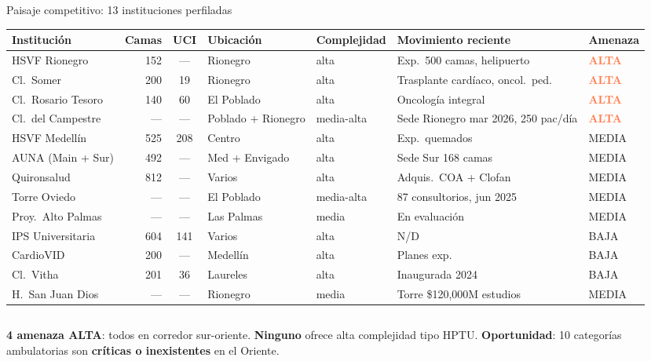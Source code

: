 \documentclass[aspectratio=169, 11pt]{beamer}
\newcommand{\danger}[1]{\textcolor{coral}{\textbf{#1}}}
\begin{document}
\begin{frame}{Paisaje competitivo: 13 instituciones perfiladas}

\vspace{-4pt}
{\tiny\setlength{\tabcolsep}{3pt}
\begin{tabular}{@{}lrcllll@{}}
\toprule
\textbf{Institución} & \textbf{Camas} & \textbf{UCI} & \textbf{Ubicación} & \textbf{Complejidad} & \textbf{Movimiento reciente} & \textbf{Amenaza} \\
\midrule
\rowcolor{coral!8}
HSVF Rionegro & 152 & --- & Rionegro & alta & Exp.\ 500 camas, helipuerto & \danger{ALTA} \\
\rowcolor{coral!8}
Cl.\ Somer & 200 & 19 & Rionegro & alta & Trasplante cardíaco, oncol.\ ped. & \danger{ALTA} \\
\rowcolor{coral!6}
Cl.\ Rosario Tesoro & 140 & 60 & El Poblado & alta & Oncología integral & \danger{ALTA} \\
\rowcolor{coral!6}
Cl.\ del Campestre & --- & --- & Poblado + Rionegro & media-alta & Sede Rionegro mar 2026, 250 pac/día & \danger{ALTA} \\
HSVF Medellín & 525 & 208 & Centro & alta & Exp.\ quemados & MEDIA \\
AUNA (Main + Sur) & 492 & --- & Med + Envigado & alta & Sede Sur 168 camas & MEDIA \\
Quironsalud & 812 & --- & Varios & alta & Adquis.\ COA + Clofan & MEDIA \\
Torre Oviedo & --- & --- & El Poblado & media-alta & 87 consultorios, jun 2025 & MEDIA \\
Proy.\ Alto Palmas & --- & --- & Las Palmas & media & En evaluación & MEDIA \\
IPS Universitaria & 604 & 141 & Varios & alta & N/D & BAJA \\
CardioVID & 200 & --- & Medellín & alta & Planes exp. & BAJA \\
Cl.\ Vitha & 201 & 36 & Laureles & alta & Inaugurada 2024 & BAJA \\
H.\ San Juan Dios & --- & --- & Rionegro & media & Torre \$120,000M estudios & MEDIA \\
\bottomrule
\end{tabular}
}

\vspace{4pt}
\begin{columns}[T]
{\scriptsize\textbf{4 amenaza ALTA}: todos en corredor sur-oriente. \textbf{Ninguno} ofrece alta complejidad tipo HPTU.}
{\scriptsize\textbf{Oportunidad}: 10 categorías ambulatorias son \textbf{críticas o inexistentes} en el Oriente.}
\end{columns}
\end{frame}
\end{document}
